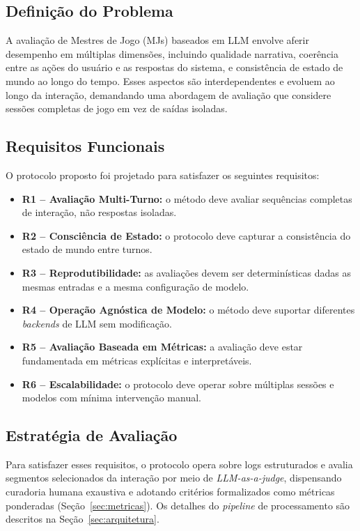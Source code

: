 \documentclass[12pt]{article}
\begin{document}
\subsection{Definição do Problema}

A avaliação de Mestres de Jogo (MJs) baseados em LLM envolve aferir desempenho em múltiplas dimensões, incluindo qualidade narrativa, coerência entre as ações do usuário e as respostas do sistema, e consistência de estado de mundo ao longo do tempo. Esses aspectos são interdependentes e evoluem ao longo da interação, demandando uma abordagem de avaliação que considere sessões completas de jogo em vez de saídas isoladas.

\subsection{Requisitos Funcionais}
\label{sec:requisitos}

O protocolo proposto foi projetado para satisfazer os seguintes requisitos:

\begin{itemize}[leftmargin=2.4em]
  \item \textbf{R1 -- Avaliação Multi-Turno:} o método deve avaliar sequências completas de interação, não respostas isoladas.
  \item \textbf{R2 -- Consciência de Estado:} o protocolo deve capturar a consistência do estado de mundo entre turnos.
  \item \textbf{R3 -- Reprodutibilidade:} as avaliações devem ser determinísticas dadas as mesmas entradas e a mesma configuração de modelo.
  \item \textbf{R4 -- Operação Agnóstica de Modelo:} o método deve suportar diferentes \textit{backends} de LLM sem modificação.
  \item \textbf{R5 -- Avaliação Baseada em Métricas:} a avaliação deve estar fundamentada em métricas explícitas e interpretáveis.
  \item \textbf{R6 -- Escalabilidade:} o protocolo deve operar sobre múltiplas sessões e modelos com mínima intervenção manual.
\end{itemize}

\subsection{Estratégia de Avaliação}

Para satisfazer esses requisitos, o protocolo opera sobre logs estruturados e avalia segmentos selecionados da interação por meio de \textit{LLM-as-a-judge}, dispensando curadoria humana exaustiva e adotando critérios formalizados como métricas ponderadas (Seção~\ref{sec:metricas}). Os detalhes do \textit{pipeline} de processamento são descritos na Seção~\ref{sec:arquitetura}.
\end{document}

